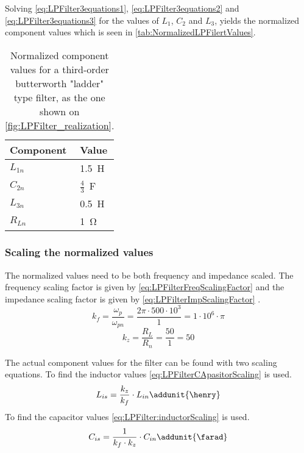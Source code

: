 Solving \autoref{eq:LPFilter3equations1}, \autoref{eq:LPFilter3equations2} and \autoref{eq:LPFilter3equations3} for the values of $L_{1}$, $C_{2}$ and $L_{3}$, yields the normalized component values which is seen in \autoref{tab:NormalizedLPFilertValues}. 
\begin{table}[h]
	\centering
	\caption{Normalized component values for a third-order butterworth "ladder" type filter, as the one shown on \autoref{fig:LPFilter_realization}.}\label{tab:NormalizedLPFilertValues}
	\begin{tabular}{l l }
		\textbf{Component}	& \textbf{Value}	\\ \toprule \rowcolor{lightGrey}
		$L_{1n}$	& \SI{1.5}{\henry}		\\ 
		$C_{2n}$	& $\frac{4}{3}$~\si{\farad} 	\\ \rowcolor{lightGrey}
		$L_{3n}$	& \SI{0.5}{\henry} 		\\ 
		$R_{Ln}$	& \SI{1}{\ohm}			\\
	\end{tabular}
\end{table}

\subsubsection{Scaling the normalized values}
The normalized values need to be both frequency and impedance scaled. The frequency scaling factor is given by \autoref{eq:LPFilterFreqScalingFactor} and the impedance scaling factor is given by \autoref{eq:LPFilterImpScalingFactor} \citep{AnagogFilters}. 
\begin{equation} \label{eq:LPFilterFreqScalingFactor}
k_{f} = \frac{\omega_{p}}{\omega_{pn}} = \frac{2\pi \cdot 500 \cdot 10^{3}}{1}= 1 \cdot 10^{6} \cdot \pi
\end{equation}
\begin{equation} \label{eq:LPFilterImpScalingFactor} 
k_{z} = \frac{R_{L}}{R_{n}} = \frac{50}{1} = 50 
\end{equation}

The actual component values for the filter can be found with two scaling equations. To find the inductor values \autoref{eq:LPFilterCApasitorScaling} is used. 
 \begin{equation} \label{eq:LPFilterCApasitorScaling}
L_{is} = \frac{k_{z}}{k_{f}} \cdot L_{in} \addunit{\henry}
\end{equation}
\startexplain
{}
\stopexplain
To find the capacitor values \autoref{eq:LPFilter:inductorScaling} is used.
\begin{equation} \label{eq:LPFilter:inductorScaling} 
C_{is} = \frac{1}{k_{f} \cdot k_{z}} \cdot C_{in} \addunit{\farad}
\end{equation}
\startexplain
{}
\stopexplain

